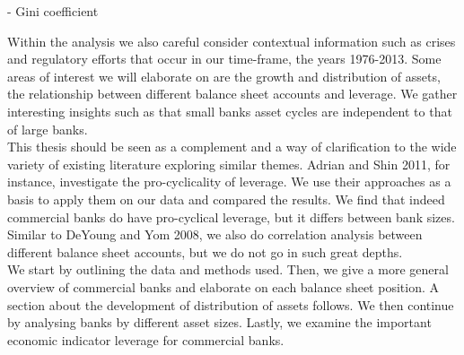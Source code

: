 \documentclass[12pt, a4paper]{article} %
\begin{document}
- Gini coefficient 


Within the analysis we also careful consider contextual information such as crises and regulatory efforts that occur in our time-frame, the years 1976-2013. Some areas of interest we will elaborate on are the growth and distribution of assets, the relationship between different balance sheet accounts and leverage. We gather interesting insights such as that small banks asset cycles are independent to that of large banks.\\
This thesis should be seen as a complement and a way of clarification to the wide variety of existing literature exploring similar themes. Adrian and Shin 2011, for instance, investigate the pro-cyclicality of leverage. We use their approaches as a basis to apply them on our data and compared the results. We find that indeed commercial banks do have pro-cyclical leverage, but it differs between bank sizes. Similar to DeYoung and Yom 2008, we also do correlation analysis between different balance sheet accounts, but we do not go in such great depths.\\
We start by outlining the data and methods used. Then, we give a more general overview of commercial banks and elaborate on each balance sheet position. A section about the development of distribution of assets follows. We then continue by analysing banks by different asset sizes. Lastly, we examine the important economic indicator leverage for commercial banks.
\end{document}
